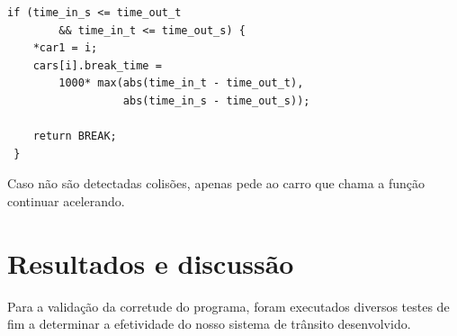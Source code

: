\documentclass[10pt,twocolumn,letterpaper]{article}
\begin{document}
\begin{lstlisting}[caption={Continuação do algoritmo de detecção de colisão (3)}, label=Algorithm]
if (time_in_s <= time_out_t 
        && time_in_t <= time_out_s) {
    *car1 = i;
    cars[i].break_time = 
        1000* max(abs(time_in_t - time_out_t), 
                  abs(time_in_s - time_out_s));
    
    return BREAK;
 }
\end{lstlisting}

Caso não são detectadas colisões, apenas pede ao carro que chama a função continuar acelerando.

\section{Resultados e discussão}
Para a validação da corretude do programa, foram executados diversos testes de fim a determinar a efetividade do nosso sistema de trânsito desenvolvido.

{\small


}
\end{document}

